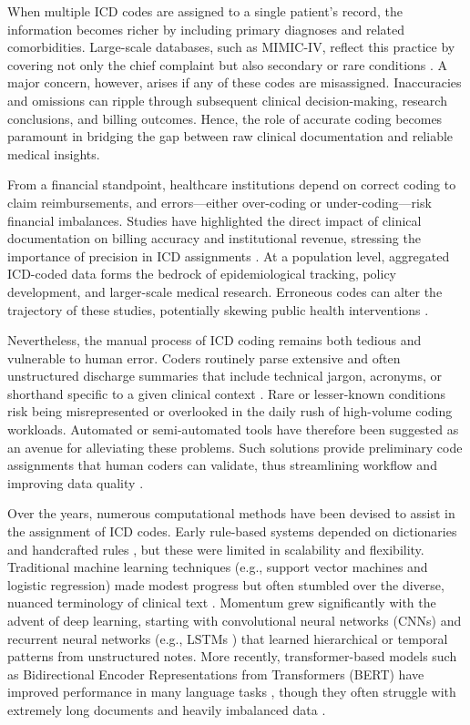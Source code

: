 When multiple ICD codes are assigned to a single patient's record, the information becomes richer by including primary diagnoses and related comorbidities. Large-scale databases, such as MIMIC-IV, reflect this practice by covering not only the chief complaint but also secondary or rare conditions \citep{johnson2023mimicivscidata}. A major concern, however, arises if any of these codes are misassigned. Inaccuracies and omissions can ripple through subsequent clinical decision-making, research conclusions, and billing outcomes. Hence, the role of accurate coding becomes paramount in bridging the gap between raw clinical documentation and reliable medical insights.

From a financial standpoint, healthcare institutions depend on correct coding to claim reimbursements, and errors---either over-coding or under-coding---risk financial imbalances. Studies have highlighted the direct impact of clinical documentation on billing accuracy and institutional revenue, stressing the importance of precision in ICD assignments \citep{dong2022automated}. At a population level, aggregated ICD-coded data forms the bedrock of epidemiological tracking, policy development, and larger-scale medical research. Erroneous codes can alter the trajectory of these studies, potentially skewing public health interventions \citep{edin2023automated}.

Nevertheless, the manual process of ICD coding remains both tedious and vulnerable to human error. Coders routinely parse extensive and often unstructured discharge summaries that include technical jargon, acronyms, or shorthand specific to a given clinical context \citep{wrenn2010quantifying}. Rare or lesser-known conditions risk being misrepresented or overlooked in the daily rush of high-volume coding workloads. Automated or semi-automated tools have therefore been suggested as an avenue for alleviating these problems. Such solutions provide preliminary code assignments that human coders can validate, thus streamlining workflow and improving data quality \citep{campbell2020computer}.

Over the years, numerous computational methods have been devised to assist in the assignment of ICD codes. Early rule-based systems depended on dictionaries and handcrafted rules \citep{farkas2008automatic}, but these were limited in scalability and flexibility. Traditional machine learning techniques (e.g., support vector machines and logistic regression) made modest progress but often stumbled over the diverse, nuanced terminology of clinical text \citep{scheurwegs2017data,perotte2014diagnosis}. Momentum grew significantly with the advent of deep learning, starting with convolutional neural networks (CNNs) \citep{kim2014convolutional,mullenbach2018explainable} and recurrent neural networks (e.g., LSTMs \citep{hochreiter1997long}) that learned hierarchical or temporal patterns from unstructured notes. More recently, transformer-based models such as Bidirectional Encoder Representations from Transformers (BERT) have improved performance in many language tasks \citep{devlin2019bert}, though they often struggle with extremely long documents and heavily imbalanced data \citep{gao2021limitations,huang2022plm}.

